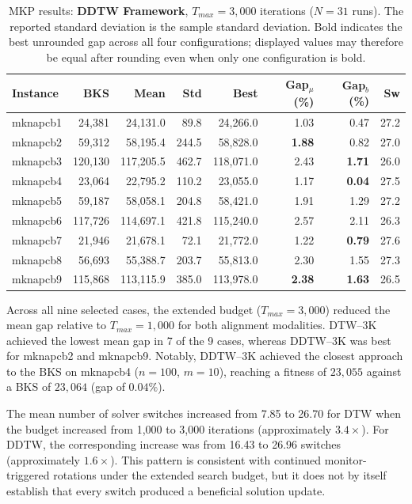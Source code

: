\begin{table}[htbp]
\centering
\caption{MKP results: \textbf{DDTW Framework}, $T_{max} = 3{,}000$ iterations
($N=31$ runs). The reported standard deviation is the sample standard
deviation. Bold indicates the best unrounded gap across all four
configurations; displayed values may therefore be equal after rounding even
when only one configuration is bold.}
\label{tab:mkp_ddtw_3k}
\begin{tabular}{lrrrrrrr}
\toprule
\textbf{Instance} & \textbf{BKS} & \textbf{Mean} & \textbf{Std} & \textbf{Best} & \textbf{Gap$_\mu$ (\%)} & \textbf{Gap$_b$ (\%)} & \textbf{Sw} \\
\midrule
mknapcb1 & 24,381 & 24,131.0 & 89.8 & 24,266.0 & 1.03 & 0.47 & 27.2 \\
mknapcb2 & 59,312 & 58,195.4 & 244.5 & 58,828.0 & \textbf{1.88} & 0.82 & 27.0 \\
mknapcb3 & 120,130 & 117,205.5 & 462.7 & 118,071.0 & 2.43 & \textbf{1.71} & 26.0 \\
mknapcb4 & 23,064 & 22,795.2 & 110.2 & 23,055.0 & 1.17 & \textbf{0.04} & 27.5 \\
mknapcb5 & 59,187 & 58,058.1 & 204.8 & 58,421.0 & 1.91 & 1.29 & 27.2 \\
mknapcb6 & 117,726 & 114,697.1 & 421.8 & 115,240.0 & 2.57 & 2.11 & 26.3 \\
mknapcb7 & 21,946 & 21,678.1 & 72.1 & 21,772.0 & 1.22 & \textbf{0.79} & 27.6 \\
mknapcb8 & 56,693 & 55,388.7 & 203.7 & 55,813.0 & 2.30 & 1.55 & 27.3 \\
mknapcb9 & 115,868 & 113,115.9 & 385.0 & 113,978.0 & \textbf{2.38} & \textbf{1.63} & 26.5 \\
\bottomrule
\end{tabular}
\end{table}

Across all nine selected cases, the extended budget ($T_{max} = 3{,}000$)
reduced the mean gap relative to $T_{max} = 1{,}000$ for both alignment
modalities. DTW--3K achieved the lowest mean gap in 7 of the 9 cases, whereas
DDTW--3K was best for mknapcb2 and mknapcb9. Notably, DDTW--3K achieved the
closest approach to the BKS on mknapcb4 ($n=100$, $m=10$), reaching a fitness
of $23{,}055$ against a BKS of $23{,}064$ (gap of $0.04\%$).

The mean number of solver switches increased from 7.85 to 26.70 for DTW when
the budget increased from 1,000 to 3,000 iterations (approximately $3.4\times$).
For DDTW, the corresponding increase was from 16.43 to 26.96 switches
(approximately $1.6\times$). This pattern is consistent with continued
monitor-triggered rotations under the extended search budget, but it does not
by itself establish that every switch produced a beneficial solution update.





